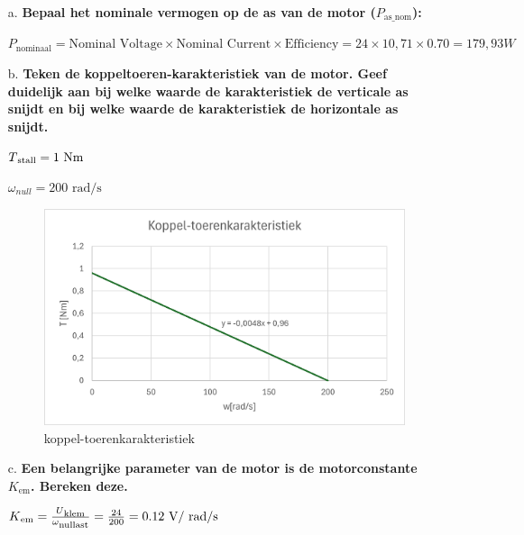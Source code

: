 \begin{enumerate}
    \item [a.] \textbf{Bepaal het nominale vermogen op de as van de motor ($P_{\text{as\_nom}}$):}
    
        $P_{\text{nominaal}} = \text{Nominal Voltage} \times \text{Nominal Current} \times \text{Efficiency} = 24 \times 10,71 \times 0.70 = 179,93W$



    \item [b.] \textbf{Teken de koppeltoeren-karakteristiek van de motor. Geef duidelijk aan bij
    welke waarde de karakteristiek de verticale as snijdt en bij welke waarde de
    karakteristiek de horizontale as snijdt.}


        $T\textsubscript{stall} = 1 \text{ Nm}$

        $\omega_{null} = 200 \text{ rad/s}$

        \begin{figure}[h]
            \centering
            \includegraphics[scale=0.6]{koppel-toerenkarakteristiek 1b.png}
            \caption{koppel-toerenkarakteristiek}
        \end{figure}

    \item [c.] \textbf{Een belangrijke parameter van de motor is de motorconstante $K_{\text{em}}$.
    Bereken deze.}

        $K\textsubscript{em} = \frac{U\textsubscript{klem}}{\omega\textsubscript{nullast}} = \frac{24}{200} = 0.12 \text{ V/ rad/s}$


\end{enumerate}
